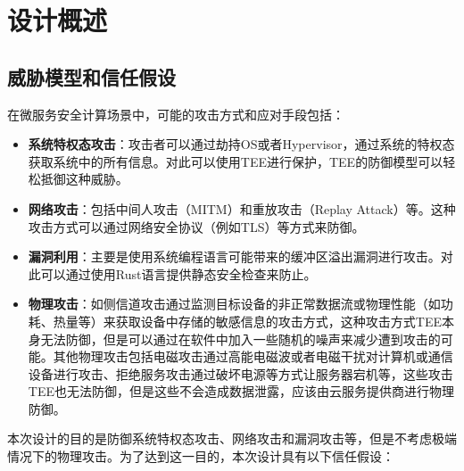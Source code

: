 \section{设计概述}\label{sec:overview}

\subsection{威胁模型和信任假设}\label{subsec:threat-model}

在微服务安全计算场景中，可能的攻击方式和应对手段包括：

\begin{itemize}
    \item \textbf{系统特权态攻击}：攻击者可以通过劫持OS或者Hypervisor，通过系统的特权态获取系统中的所有信息。对此可以使用TEE进行保护，TEE的防御模型可以轻松抵御这种威胁。
    \item \textbf{网络攻击}：包括中间人攻击（MITM）和重放攻击（Replay Attack）等。这种攻击方式可以通过网络安全协议（例如TLS）等方式来防御。
    \item \textbf{漏洞利用}：主要是使用系统编程语言可能带来的缓冲区溢出漏洞进行攻击。对此可以通过使用Rust语言提供静态安全检查来防止。
    \item \textbf{物理攻击}：如侧信道攻击通过监测目标设备的非正常数据流或物理性能（如功耗、热量等）来获取设备中存储的敏感信息的攻击方式，这种攻击方式TEE本身无法防御，但是可以通过在软件中加入一些随机的噪声来减少遭到攻击的可能。其他物理攻击包括电磁攻击通过高能电磁波或者电磁干扰对计算机或通信设备进行攻击、拒绝服务攻击通过破坏电源等方式让服务器宕机等，这些攻击TEE也无法防御，但是这些不会造成数据泄露，应该由云服务提供商进行物理防御。
\end{itemize}

本次设计的目的是防御系统特权态攻击、网络攻击和漏洞攻击等，但是不考虑极端情况下的物理攻击。为了达到这一目的，本次设计具有以下信任假设：

